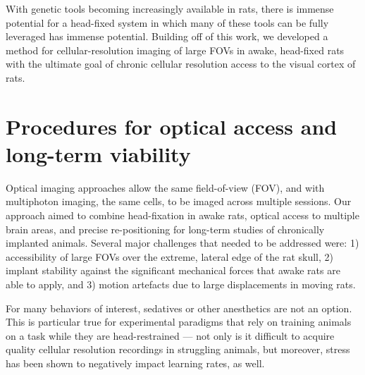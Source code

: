 With genetic tools becoming increasingly available in rats, there is immense potential for a head-fixed system in which many of these tools can be fully leveraged has immense potential. Building off of this work, we developed a method for cellular-resolution imaging of large FOVs in awake, head-fixed rats with the ultimate goal of chronic cellular resolution access to the visual cortex of rats. 

\section{Procedures for optical access and long-term viability} 

Optical imaging approaches allow the same field-of-view (FOV), and with multiphoton imaging, the same cells, to be imaged across multiple sessions. Our approach aimed to combine head-fixation in awake rats, optical access to multiple brain areas, and precise re-positioning for long-term studies of chronically implanted animals. Several major challenges that needed to be addressed were:  1) accessibility of large FOVs over the extreme, lateral edge of the rat skull, 2) implant stability against the significant mechanical forces that awake rats are able to apply, and 3) motion artefacts due to large displacements in moving rats. 

For many behaviors of interest, sedatives or other anesthetics are not an option. This is particular true for experimental paradigms that rely on training animals on a task while they are head-restrained --- not only is it difficult to acquire quality cellular resolution recordings in struggling animals, but moreover, stress has been shown to negatively impact learning rates, as well\cite{REFREF}. 

